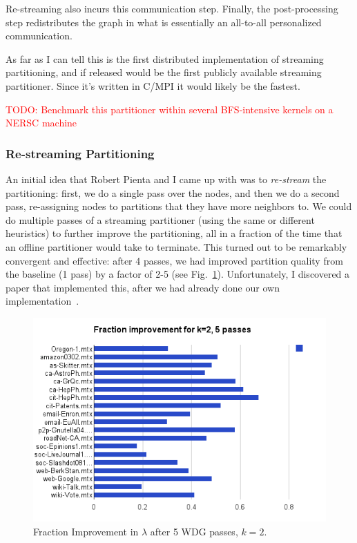 \documentclass[11pt]{article}
\newcommand\warning[1]{\textcolor{red}{#1}}
\begin{document}
Re-streaming also incurs this communication step. Finally, the post-processing step redistributes the graph in what is essentially an all-to-all personalized communication. 

As far as I can tell this is the first distributed implementation of streaming partitioning, and if released would be the first publicly available streaming partitioner. Since it's written in C/MPI it would likely be the fastest. 

\warning{TODO: Benchmark this partitioner within several BFS-intensive kernels on a NERSC machine}

\subsubsection{Re-streaming Partitioning}
An initial idea that Robert Pienta and I came up with was to \textit{re-stream} the partitioning: first, we do a single pass over the nodes, and then we do a second pass, re-assigning nodes to partitions that they have more neighbors to. We could do multiple passes of a streaming partitioner (using the same or different heuristics) to further improve the partitioning, all in a fraction of the time that an offline partitioner would take to terminate.  This turned out to be remarkably convergent and effective: after 4 passes, we had improved partition quality from the baseline (1 pass) by a factor of 2-5 (see Fig.~\ref{fig:03}). Unfortunately, I discovered a paper that implemented this, after we had already done our own implementation~\cite{Nishiura13}.

\begin{figure}[h!]
\centering
\includegraphics[scale=0.70] {figures/litreview/2partfrac}
\caption[Caption for]{Fraction Improvement in $\lambda$ after 5 WDG passes, $k=2$.}
\label{fig:03}
\end{figure}
\end{document}
